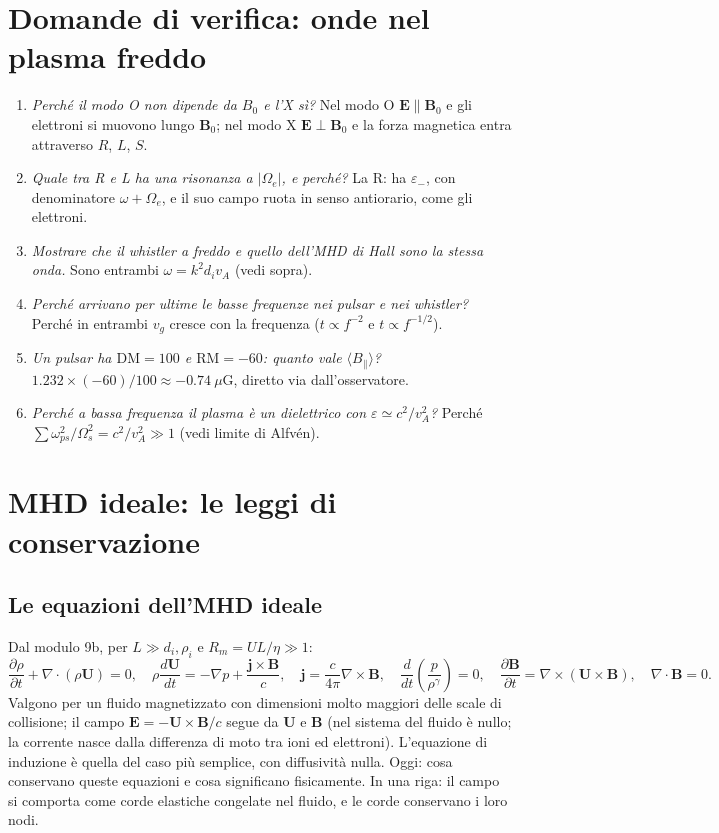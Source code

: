 \section{Domande di verifica: onde nel plasma freddo}
\begin{enumerate}
\item \textit{Perché il modo O non dipende da $B_0$ e l'X sì?} Nel modo O $\mathbf{E}\parallel\mathbf{B}_0$ e gli elettroni si muovono lungo $\mathbf{B}_0$; nel modo X $\mathbf{E}\perp\mathbf{B}_0$ e la forza magnetica entra attraverso $R$, $L$, $S$.
\item \textit{Quale tra R e L ha una risonanza a $|\Omega_e|$, e perché?} La R: ha $\varepsilon_-$, con denominatore $\omega+\Omega_e$, e il suo campo ruota in senso antiorario, come gli elettroni.
\item \textit{Mostrare che il whistler a freddo e quello dell'MHD di Hall sono la stessa onda.} Sono entrambi $\omega=k^2d_iv_A$ (vedi sopra).
\item \textit{Perché arrivano per ultime le basse frequenze nei pulsar e nei whistler?} Perché in entrambi $v_g$ cresce con la frequenza ($t\propto f^{-2}$ e $t\propto f^{-1/2}$).
\item \textit{Un pulsar ha $\mathrm{DM}=100$ e $\mathrm{RM}=-60$: quanto vale $\langle B_\parallel\rangle$?} $1.232\times(-60)/100\approx-0.74~\mu$G, diretto via dall'osservatore.
\item \textit{Perché a bassa frequenza il plasma è un dielettrico con $\varepsilon\simeq c^2/v_A^2$?} Perché $\sum\omega_{ps}^2/\Omega_s^2=c^2/v_A^2\gg1$ (vedi limite di Alfv\'en).
\end{enumerate}

\section{MHD ideale: le leggi di conservazione}
\subsection{Le equazioni dell'MHD ideale}
Dal modulo 9b, per $L\gg d_i,\rho_i$ e $R_m=UL/\eta\gg1$:
\begin{equation}
\frac{\partial\rho}{\partial t}+\nabla\cdot(\rho\mathbf{U})=0,\quad\rho\frac{d\mathbf{U}}{dt}=-\nabla p+\frac{\mathbf{j}\times\mathbf{B}}{c},\quad\mathbf{j}=\frac{c}{4\pi}\nabla\times\mathbf{B},\quad\frac{d}{dt}\left(\frac{p}{\rho^\gamma}\right)=0,\quad\frac{\partial\mathbf{B}}{\partial t}=\nabla\times(\mathbf{U}\times\mathbf{B}),\quad\nabla\cdot\mathbf{B}=0 .
\end{equation}
Valgono per un fluido magnetizzato con dimensioni molto maggiori delle scale di collisione; il campo $\mathbf{E}=-\mathbf{U}\times\mathbf{B}/c$ segue da $\mathbf{U}$ e $\mathbf{B}$ (nel sistema del fluido è nullo; la corrente nasce dalla differenza di moto tra ioni ed elettroni). L'equazione di induzione è quella del caso più semplice, con diffusività nulla. Oggi: cosa conservano queste equazioni e cosa significano fisicamente. In una riga: il campo si comporta come corde elastiche congelate nel fluido, e le corde conservano i loro nodi.


